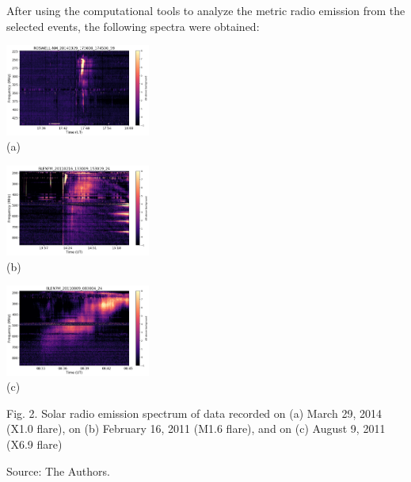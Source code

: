 \documentclass[a0paper,portrait]{baposter}
\begin{document}
\begin{poster}
{After using the computational tools to analyze the metric radio emission from the selected events,
    the following spectra were obtained:
\begin{center}
\includegraphics[height=3cm, keepaspectratio]{figures/ROSWELL-NM.png}\\
\tiny(a)

\includegraphics[height=3cm, keepaspectratio]{figures/BLEN7M_20110216.png}\\
\tiny(b)

\includegraphics[height=3cm, keepaspectratio]{figures/BLEN7M_20110809.png}\\
\tiny(c)

\scriptsize Fig. 2. Solar radio emission spectrum of data recorded on (a) March 29, 2014 (X1.0 flare),
on (b) February 16, 2011 (M1.6 flare), and on (c) August 9, 2011 (X6.9 flare)

\scriptsize Source: The Authors.
\end{center}

}


\end{poster}
\end{document}
